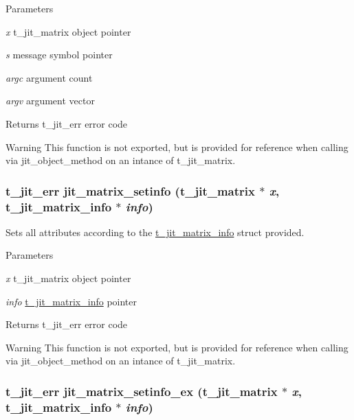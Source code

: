 \begin{DoxyParams}{Parameters}
\item[{\em x}]t\_\-jit\_\-matrix object pointer \item[{\em s}]message symbol pointer \item[{\em argc}]argument count \item[{\em argv}]argument vector\end{DoxyParams}
\begin{DoxyReturn}{Returns}
t\_\-jit\_\-err error code
\end{DoxyReturn}
\begin{DoxyWarning}{Warning}
This function is not exported, but is provided for reference when calling via jit\_\-object\_\-method on an intance of t\_\-jit\_\-matrix. 
\end{DoxyWarning}
\hypertarget{group__matrixmod_ga2324cd46df9bcd18c84d6bd49bf1b091}{
\subsubsection[{jit\_\-matrix\_\-setinfo}]{\setlength{\rightskip}{0pt plus 5cm}t\_\-jit\_\-err jit\_\-matrix\_\-setinfo (t\_\-jit\_\-matrix $\ast$ {\em x}, \/  {\bf t\_\-jit\_\-matrix\_\-info} $\ast$ {\em info})}}
\label{group__matrixmod_ga2324cd46df9bcd18c84d6bd49bf1b091}


Sets all attributes according to the \hyperlink{structt__jit__matrix__info}{t\_\-jit\_\-matrix\_\-info} struct provided. 
\begin{DoxyParams}{Parameters}
\item[{\em x}]t\_\-jit\_\-matrix object pointer \item[{\em info}]\hyperlink{structt__jit__matrix__info}{t\_\-jit\_\-matrix\_\-info} pointer\end{DoxyParams}
\begin{DoxyReturn}{Returns}
t\_\-jit\_\-err error code
\end{DoxyReturn}
\begin{DoxyWarning}{Warning}
This function is not exported, but is provided for reference when calling via jit\_\-object\_\-method on an intance of t\_\-jit\_\-matrix. 
\end{DoxyWarning}
\hypertarget{group__matrixmod_ga626c0457e1ade74e808c1afcfd22a9c2}{
\subsubsection[{jit\_\-matrix\_\-setinfo\_\-ex}]{\setlength{\rightskip}{0pt plus 5cm}t\_\-jit\_\-err jit\_\-matrix\_\-setinfo\_\-ex (t\_\-jit\_\-matrix $\ast$ {\em x}, \/  {\bf t\_\-jit\_\-matrix\_\-info} $\ast$ {\em info})}}
\label{group__matrixmod_ga626c0457e1ade74e808c1afcfd22a9c2}


